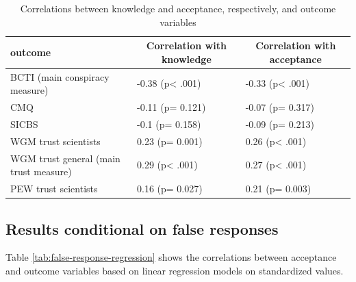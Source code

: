 \documentclass[
  doc,floatsintext]{apa6}
\begin{document}
\begin{table}[tbp]

\begin{center}
\begin{threeparttable}

\caption{\label{tab:correlations-outcomes}Correlations between knowledge and acceptance, respectively, and outcome variables}

\begin{tabular}{lll}
\toprule
outcome & \multicolumn{1}{c}{Correlation with knowledge} & \multicolumn{1}{c}{Correlation with acceptance}\\
\midrule
BCTI (main conspiracy measure) & -0.38 (p< .001) & -0.33 (p< .001)\\
CMQ & -0.11 (p= 0.121) & -0.07 (p= 0.317)\\
SICBS & -0.1 (p= 0.158) & -0.09 (p= 0.213)\\
WGM trust scientists & 0.23 (p= 0.001) & 0.26 (p< .001)\\
WGM trust general (main trust measure) & 0.29 (p< .001) & 0.27 (p< .001)\\
PEW trust scientists & 0.16 (p= 0.027) & 0.21 (p= 0.003)\\
\bottomrule
\end{tabular}

\end{threeparttable}
\end{center}

\end{table}

\subsection{Results conditional on false responses}\label{results-conditional-on-false-responses}

Table \ref{tab:false-response-regression} shows the correlations between acceptance and outcome variables based on linear regression models on standardized values.
\end{document}
